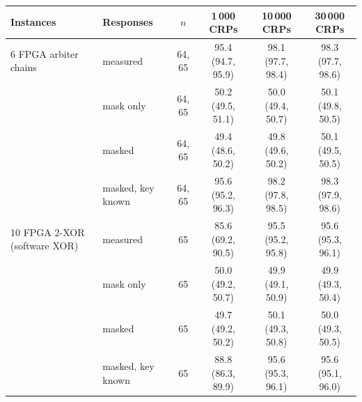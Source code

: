 \begin{tabular}{llcccc}
\toprule
Instances & Responses & $n$ & 1\,000 CRPs & 10\,000 CRPs & 30\,000 CRPs \\
\midrule
6 FPGA arbiter chains & measured & 64, 65 & 95.4 (94.7, 95.9) & 98.1 (97.7, 98.4) & 98.3 (97.7, 98.6) \\
 & mask only & 64, 65 & 50.2 (49.5, 51.1) & 50.0 (49.4, 50.7) & 50.1 (49.8, 50.5) \\
 & masked & 64, 65 & 49.4 (48.6, 50.2) & 49.8 (49.6, 50.2) & 50.1 (49.5, 50.5) \\
 & masked, key known & 64, 65 & 95.6 (95.2, 96.3) & 98.2 (97.8, 98.5) & 98.3 (97.9, 98.6) \\
\midrule
10 FPGA 2-XOR (software XOR) & measured & 65 & 85.6 (69.2, 90.5) & 95.5 (95.2, 95.8) & 95.6 (95.3, 96.1) \\
 & mask only & 65 & 50.0 (49.2, 50.7) & 49.9 (49.1, 50.9) & 49.9 (49.3, 50.4) \\
 & masked & 65 & 49.7 (49.2, 50.2) & 50.1 (49.3, 50.8) & 50.0 (49.3, 50.5) \\
 & masked, key known & 65 & 88.8 (86.3, 89.9) & 95.6 (95.3, 96.1) & 95.6 (95.1, 96.0) \\
\bottomrule
\end{tabular}
